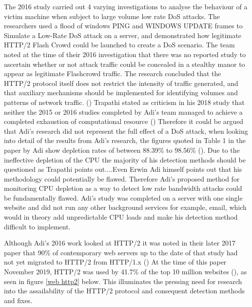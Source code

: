 The 2016 study carried out 4 varying investigations to analyse the behaviour of a victim machine when subject to large volume low rate DoS attacks. The researchers used a flood of windows PING and WINDOWS UPDATE frames to Simulate a Low-Rate DoS attack on a server, and demonstrated how legitimate HTTP/2 Flash Crowd could be launched to create a DoS scenario.  The team noted at the time of their 2016 investigation that there was no reported study to ascertain whether or not attack traffic could be concealed in a stealthy manor to appear as legitimate Flashcrowd traffic. The research concluded that the HTTP/2 protocol itself does not restrict the intensity of traffic generated, and that auxiliary mechanisms should be implemented for identifying volumes and patterns of network traffic. (\cite{Adi2016}) Trapathi stated as criticism in his 2018 study that neither the 2015 or 2016 studies completed by Adi's team managed to achieve a completed exhaustion of computational resource (\cite{tripathi2018slow}) Therefore it could be argued that Adi's research did not represent the full effect of a DoS attack, when looking into detail of the results from Adi's research, the figures quoted in Table 1 in the paper by Adi show depletion rates of between 88.39\% to 98.56\% (\cite{Adi2016}). Due to the ineffective depletion of the CPU the majority of his detection methods should be questioned as Trapathi points out....Even Erwin Adi himself points out that his methodology could potentially be flawed. Therefore Adi's proposed method for monitoring CPU depletion as a way to detect low rate bandwidth attacks could be fundamentally flawed. Adi's study was completed on a server with one single website and did not run any other background services for example, email, which would in theory add unpredictable CPU loads and make his detection method difficult to implement.

Although Adi's 2016 work looked at HTTP/2 it was noted in their later 2017 paper that 90\% of contemporary web servers up to the date of that study had not yet migrated to HTTP/2 from HTTP/1.x (\cite{adi2017stealthy}) At the time of this paper November 2019, HTTP/2 was used by 41.7\% of the top 10 million websites (\cite{w3techs}), as seen in figure \ref{web http2} below. This illuminates the pressing need for research into the assailability of the HTTP/2 protocol and consequent detection methods and fixes. 
 
